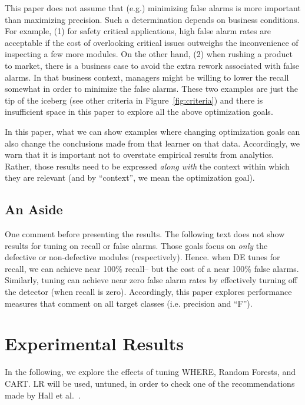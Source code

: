 \documentclass{sig-alternative}
\newcommand{\fig}[1]{Figure~\ref{fig:#1}}
\begin{document}
This paper does not assume that (e.g.) minimizing false alarms is 
more important than maximizing   precision. Such a determination 
depends on   business conditions.
For example,
(1) for safety critical applications, high false alarm rates are  acceptable if the cost
of overlooking  critical issues outweighs the inconvenience of   inspecting a few more
modules. 
On the other hand, (2) when rushing a product to market,  there is a business case to 
avoid the extra rework associated with false alarms.  In that business context, 
managers might be willing to lower the recall somewhat in order to minimize the false alarms.
These two examples are just the tip of the iceberg (see other criteria in \fig{criteria})
and there is insufficient space in this paper to explore all the above optimization goals.

In this paper, what we can  show  examples where  changing  optimization goals can also change 
the conclusions made from that learner on that data. Accordingly, we warn that it is 
important not to overstate  empirical results from  analytics.
Rather, those results need to be expressed {\em along with} the context within which they are
relevant (and by ``context'', we mean the optimization goal).



\subsection{An Aside}

One comment before presenting the results. The following text does not
show results for tuning on recall
or false alarms. Those goals focus on {\em only}
the  defective or non-defective modules (respectively). Hence.
when DE tunes for recall, we can achieve near
100\% recall-- but the cost of a near 100\% false alarms.
Similarly,  tuning
can achieve near zero false alarm rates by effectively turning off
the detector (when recall is zero).
Accordingly,  this paper  explores performance measures that comment on all 
target classes (i.e. precision and ``F''). 




\section{Experimental Results}

In the following, we explore the effects of tuning WHERE, Random Forests,
and CART. LR will be used, untuned, in order to check one of the recommendations
made by Hall et al.~\cite{hall11}.
\end{document}
